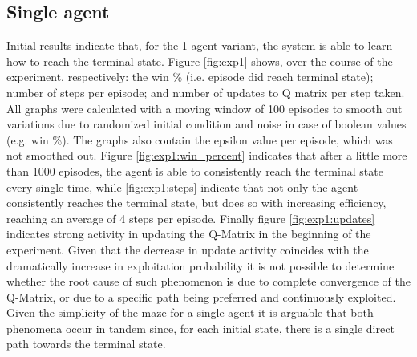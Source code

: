 \documentclass[10pt]{article}
\begin{document}
    \subsection{Single agent}
        Initial results indicate that, for the 1 agent variant, the system is able to learn how to reach the terminal state. Figure \ref{fig:exp1} shows, over the course of the experiment, respectively: the win \% (i.e. episode did reach terminal state); number of steps per episode; and number of updates to Q matrix per step taken. All graphs were calculated with a moving window of 100 episodes to smooth out variations due to randomized initial condition and noise in case of boolean values (e.g. win \%). The graphs also contain the epsilon value per episode, which was not smoothed out. Figure \ref{fig:exp1:win_percent} indicates that after a little more than 1000 episodes, the agent is able to consistently reach the terminal state every single time, while \ref{fig:exp1:steps} indicate that not only the agent consistently reaches the terminal state, but does so with increasing efficiency, reaching an average of 4 steps per episode. Finally figure \ref{fig:exp1:updates} indicates strong activity in updating the Q-Matrix in the beginning of the experiment. Given that the decrease in update activity coincides with the dramatically increase in exploitation probability it is not possible to determine whether the root cause of such phenomenon is due to complete convergence of the Q-Matrix, or due to a specific path being preferred and continuously exploited. Given the simplicity of the maze for a single agent it is arguable that both phenomena occur in tandem since, for each initial state, there is a single direct path towards the terminal state.
\end{document}
